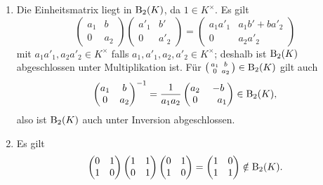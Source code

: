 \begin{solution}
  \begin{enumerate}
    \item
      Die Einheitsmatrix liegt in $\operatorname{B}_2(K)$, da $1 \in K^\times$.
      Es gilt
      \begin{equation}
        \label{equation: product of upper triangular matrices}
        \begin{pmatrix}
          a_1 & b   \\
          0   & a_2
        \end{pmatrix}
        \begin{pmatrix}
          a'_1  & b'   \\
          0     & a'_2
        \end{pmatrix}
        =
        \begin{pmatrix}
          a_1 a'_1  & a_1 b' + b a'_2 \\
          0         & a_2 a'_2
        \end{pmatrix}
      \end{equation}
      mit $a_1 a'_1, a_2 a'_2 \in K^\times$ falls $a_1, a'_1, a_2, a'_2 \in K^\times$;
      deshalb ist $\operatorname{B}_2(K)$ abgeschlossen unter Multiplikation ist.
      Für $\begin{psmallmatrix} a_1 & b \\ 0 & a_2 \end{psmallmatrix} \in \operatorname{B}_2(K)$ gilt auch
      \[
        \begin{pmatrix}
          a_1 & b   \\
          0   & a_2
        \end{pmatrix}^{-1}
        =
        \frac{1}{a_1 a_2}
        \begin{pmatrix}
          a_2 &           -b    \\
          0   & \phantom{-}a_1
        \end{pmatrix}
        \in \operatorname{B}_2(K),
      \]
      also ist $\operatorname{B}_2(K)$ auch unter Inversion abgeschlossen.
    
    \item
      Es gilt
      \[
        \begin{pmatrix}
          0 & 1 \\
          1 & 0
        \end{pmatrix}
        \begin{pmatrix}
          1 & 1 \\
          0 & 1
        \end{pmatrix}
        \begin{pmatrix}
          0 & 1 \\
          1 & 0
        \end{pmatrix}
        =
        \begin{pmatrix}
          1 & 0 \\
          1 & 1
        \end{pmatrix}
        \notin \operatorname{B}_2(K).
      \]
      

\end{enumerate}
\end{solution}
